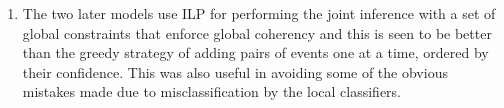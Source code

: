 \begin{enumerate}
\item {} The two later models use ILP for performing the joint inference with a set of global constraints that enforce global coherency and this is seen to be better than the greedy strategy of adding pairs of events one at a time, ordered by their confidence. This was also useful in avoiding some of the obvious mistakes made due to misclassification by the local classifiers.

\end{enumerate}
